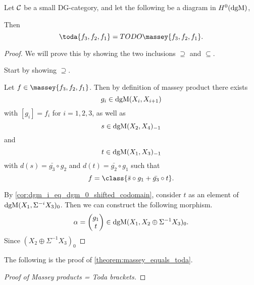 \begin{lemma}
    Let \( {\mathcal{C}} \) be a small DG-category, and let the following be a diagram in \( H^0(\operatorname{dgM}) \),
    \begin{center}
    \end{center}
    Then
    \[
        \toda{f_3, f_2, f_1} = TODO\massey{f_3, f_2, f_1}.
    \]
\end{lemma}
\begin{proof}
    We will prove this by showing the two inclusions \( \supseteq \) and \( \subseteq \).

    Start by showing \( \supseteq \).

    Let \( f \in \massey{f_3, f_2, f_1} \). Then by definition of massey product there exists
    \[
        g_i \in \operatorname{dgM}(X_i, X_{i + 1})
    \]
    with \( [g_i] = f_i \) for \( i = 1, 2, 3 \), as well as
    \[
        s \in \operatorname{dgM}(X_2, X_4)_{-1}
    \]
    and
    \[
        t \in \operatorname{dgM}(X_1, X_3)_{-1}
    \]
    with \( d(s) = \bar{g_3} \circ g_2 \) and \( d(t) = \bar{g_2} \circ g_1 \) such that
    \[
        f = \class{\bar{s} \circ g_1 + \bar{g_3} \circ t}.
    \]

    By \autoref{cor:dgm_i_eq_dgm_0_shifted_codomain}, consider \( t \) as an element of \( \operatorname{dgM}(X_1, \Sigma^{-i} X_3)_0 \). Then we can construct the following morphism.
    \[
        \alpha =
        \begin{pmatrix}
            g_1 \\
            t
        \end{pmatrix}
        \in \operatorname{dgM}(X_1, X_2 \oplus \Sigma^{-1} X_3)_0.
    \]
    Since \( (X_2 \oplus \Sigma^{-1} X_3)_0 \)
\end{proof}

The following is the proof of \autoref{theorem:massey_equals_toda}.

\begin{proof}[Proof of Massey products = Toda brackets]
    
\end{proof}